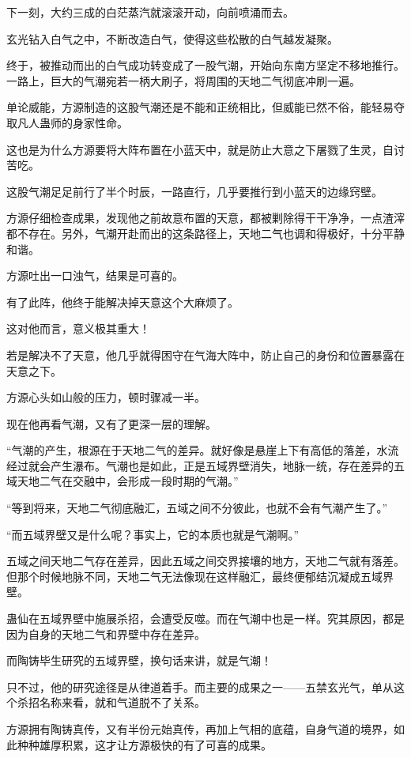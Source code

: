 \begin{this_body}
下一刻，大约三成的白茫蒸汽就滚滚开动，向前喷涌而去。

玄光钻入白气之中，不断改造白气，使得这些松散的白气越发凝聚。

终于，被推动而出的白气成功转变成了一股气潮，开始向东南方坚定不移地推行。一路上，巨大的气潮宛若一柄大刷子，将周围的天地二气彻底冲刷一遍。

单论威能，方源制造的这股气潮还是不能和正统相比，但威能已然不俗，能轻易夺取凡人蛊师的身家性命。

这也是为什么方源要将大阵布置在小蓝天中，就是防止大意之下屠戮了生灵，自讨苦吃。

这股气潮足足前行了半个时辰，一路直行，几乎要推行到小蓝天的边缘窍壁。

方源仔细检查成果，发现他之前故意布置的天意，都被剿除得干干净净，一点渣滓都不存在。另外，气潮开赴而出的这条路径上，天地二气也调和得极好，十分平静和谐。

方源吐出一口浊气，结果是可喜的。

有了此阵，他终于能解决掉天意这个大麻烦了。

这对他而言，意义极其重大！

若是解决不了天意，他几乎就得困守在气海大阵中，防止自己的身份和位置暴露在天意之下。

方源心头如山般的压力，顿时骤减一半。

现在他再看气潮，又有了更深一层的理解。

“气潮的产生，根源在于天地二气的差异。就好像是悬崖上下有高低的落差，水流经过就会产生瀑布。气潮也是如此，正是五域界壁消失，地脉一统，存在差异的五域天地二气在交融中，会形成一段时期的气潮。”

“等到将来，天地二气彻底融汇，五域之间不分彼此，也就不会有气潮产生了。”

“而五域界壁又是什么呢？事实上，它的本质也就是气潮啊。”

五域之间天地二气存在差异，因此五域之间交界接壤的地方，天地二气就有落差。但那个时候地脉不同，天地二气无法像现在这样融汇，最终便郁结沉凝成五域界壁。

蛊仙在五域界壁中施展杀招，会遭受反噬。而在气潮中也是一样。究其原因，都是因为自身的天地二气和界壁中存在差异。

而陶铸毕生研究的五域界壁，换句话来讲，就是气潮！

只不过，他的研究途径是从律道着手。而主要的成果之一——五禁玄光气，单从这个杀招名称来看，就和气道脱不了关系。

方源拥有陶铸真传，又有半份元始真传，再加上气相的底蕴，自身气道的境界，如此种种雄厚积累，这才让方源极快的有了可喜的成果。


\end{this_body}
